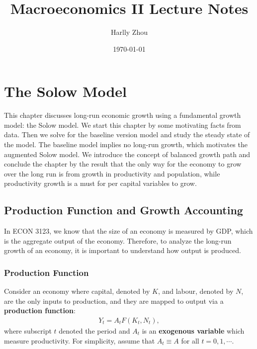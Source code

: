 \documentclass{book}
\title{Macroeconomics II Lecture Notes}
\author{Harlly Zhou}
\date{\today}
\theoremstyle{definition}
\theoremstyle{plain}
\begin{document}
\maketitle
\tableofcontents

\mainmatter

\chapter{The Solow Model}\label{chap:solow}
This chapter discusses long-run economic growth using a fundamental growth model: the Solow model. We start this chapter by some motivating facts from data. Then we solve for the baseline version model and study the steady state of the model. The baseline model implies no long-run growth, which motivates the augmented Solow model. We introduce the concept of balanced growth path and conclude the chapter by the result that the only way for the economy to grow over the long run is from growth in productivity and population, while productivity growth is a must for per capital variables to grow. 

\section{Production Function and Growth Accounting}
In ECON 3123, we know that the size of an economy is measured by GDP, which is the aggregate output of the economy. Therefore, to analyze the long-run growth of an economy, it is important to understand how output is produced. 


\subsection{Production Function}
Consider an economy where capital, denoted by $K$, and labour, denoted by $N$, are the only inputs to production, and they are mapped to output via a \textbf{production function}:
\begin{align} \label{eq:prod_func}
    Y_t = A_t F(K_t, N_t),
\end{align}
where subscript $t$ denoted the period and $A_t$ is an \textbf{exogenous variable} which measure productivity. For simplicity, assume that $A_t \equiv A$ for all $t = 0, 1, \cdots$.
\end{document}
